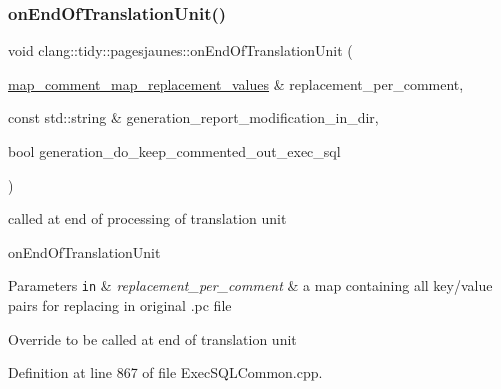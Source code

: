 \subsubsection{\texorpdfstring{on\+End\+Of\+Translation\+Unit()}{onEndOfTranslationUnit()}}
{\footnotesize\ttfamily void clang\+::tidy\+::pagesjaunes\+::on\+End\+Of\+Translation\+Unit (\begin{DoxyParamCaption}\item[{\hyperlink{_exec_s_q_l_common_8h_a488fa487a3b35e0a4a38116ffab0a469}{map\+\_\+comment\+\_\+map\+\_\+replacement\+\_\+values} \&}]{replacement\+\_\+per\+\_\+comment,  }\item[{const std\+::string \&}]{generation\+\_\+report\+\_\+modification\+\_\+in\+\_\+dir,  }\item[{bool}]{generation\+\_\+do\+\_\+keep\+\_\+commented\+\_\+out\+\_\+exec\+\_\+sql }\end{DoxyParamCaption})}



called at end of processing of translation unit 

on\+End\+Of\+Translation\+Unit


\begin{DoxyParams}[1]{Parameters}
\mbox{\tt in}  & {\em replacement\+\_\+per\+\_\+comment} & a map containing all key/value pairs for replacing in original .pc file\\
\hline
\end{DoxyParams}
Override to be called at end of translation unit 

Definition at line 867 of file Exec\+S\+Q\+L\+Common.\+cpp.

